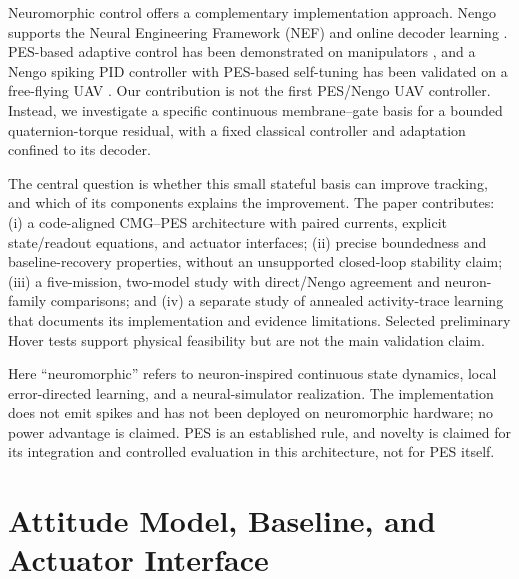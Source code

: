 \documentclass[letterpaper,10pt,conference]{IEEEtran}
\begin{document}
Neuromorphic control offers a complementary implementation approach.
Nengo supports the Neural Engineering Framework (NEF) and online decoder
learning \cite{bekolay2014nengo}. PES-based adaptive control has been
demonstrated on manipulators \cite{dewolf2016arm,dewolf2020nengo}, and a
Nengo spiking PID controller with PES-based self-tuning has been validated
on a free-flying UAV \cite{olivares2026selftuning}. Our contribution is not
the first PES/Nengo UAV controller. Instead, we investigate a specific
continuous membrane--gate basis for a bounded quaternion-torque residual,
with a fixed classical controller and adaptation confined to its decoder.

The central question is whether this small stateful basis can improve
tracking, and which of its components explains the improvement. The paper
contributes: (i) a code-aligned CMG--PES architecture with paired currents,
explicit state/readout equations, and actuator interfaces; (ii) precise
boundedness and baseline-recovery properties, without an unsupported
closed-loop stability claim; (iii) a five-mission, two-model study with
direct/Nengo agreement and neuron-family comparisons; and (iv) a separate
study of annealed activity-trace learning that documents its implementation
and evidence limitations. Selected preliminary Hover tests support
physical feasibility but are not the main validation claim.

Here ``neuromorphic'' refers to neuron-inspired continuous state dynamics,
local error-directed learning, and a neural-simulator realization. The
implementation does not emit spikes and has not been deployed on
neuromorphic hardware; no power advantage is claimed. PES is an
established rule, and novelty is claimed for its integration and controlled
evaluation in this architecture, not for PES itself.

\section{Attitude Model, Baseline, and Actuator Interface}
\label{sec:problem}
\end{document}
